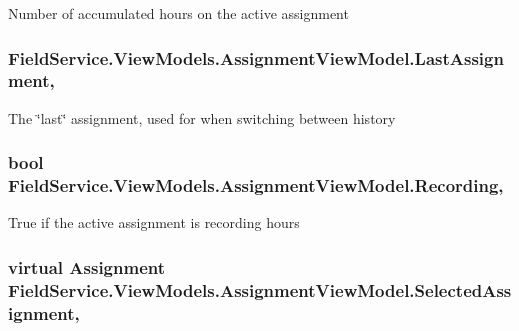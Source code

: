 Number of accumulated hours on the active assignment 

\hypertarget{class_field_service_1_1_view_models_1_1_assignment_view_model_a8e4b3bebf707937794a039f0bf7431b5}{
\subsubsection[{Last\+Assignment}]{ Field\+Service.\+View\+Models.\+Assignment\+View\+Model.\+Last\+Assignment\hspace{0.3cm}{\ttfamily [get]}, {\ttfamily [set]}}}\label{class_field_service_1_1_view_models_1_1_assignment_view_model_a8e4b3bebf707937794a039f0bf7431b5}


The \char`\"{}last\char`\"{} assignment, used for when switching between history 

\hypertarget{class_field_service_1_1_view_models_1_1_assignment_view_model_a869d106839c37753e8996fffffddfe0a}{
\subsubsection[{Recording}]{\setlength{\rightskip}{0pt plus 5cm}bool Field\+Service.\+View\+Models.\+Assignment\+View\+Model.\+Recording\hspace{0.3cm}{\ttfamily [get]}, {\ttfamily [set]}}}\label{class_field_service_1_1_view_models_1_1_assignment_view_model_a869d106839c37753e8996fffffddfe0a}


True if the active assignment is recording hours 

\hypertarget{class_field_service_1_1_view_models_1_1_assignment_view_model_a5bbbd8f4c5594233117d7b9a3726940c}{
\subsubsection[{Selected\+Assignment}]{\setlength{\rightskip}{0pt plus 5cm}virtual {\bf Assignment} Field\+Service.\+View\+Models.\+Assignment\+View\+Model.\+Selected\+Assignment\hspace{0.3cm}{\ttfamily [get]}, {\ttfamily [set]}}}\label{class_field_service_1_1_view_models_1_1_assignment_view_model_a5bbbd8f4c5594233117d7b9a3726940c}


